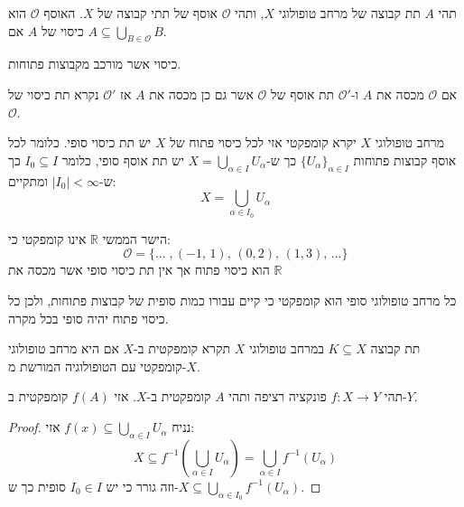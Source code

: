 \documentclass{tstextbook}
\begin{document}
\begin{definition}[כיסוי]
תהי \(A\) תת קבוצה של מרחב טופולוגי \(X\), ותהי \(\mathcal{O}\) אוסף של תתי קבוצה של \(X\). האוסף \(\mathcal{O}\) הוא כיסוי של \(A\) אם \(A\subseteq \bigcup_{ B \in \mathcal{O}}B\).

\end{definition}
\begin{definition}
כיסוי אשר מורכב מקבוצות פתוחות.

\end{definition}
\begin{definition}[תת כיסוי]
אם \(\mathcal{O}\) מכסה את \(A\) ו-\(\mathcal{O}'\) תת אוסף של \(\mathcal{O}\) אשר גם כן מכסה את \(A\) אז \(\mathcal{O'}\) נקרא תת כיסוי של \(\mathcal{O}\).

\end{definition}
\begin{definition}
מרחב טופולוגי \(X\) יקרא קומפקטי אזי לכל כיסוי פתוח של \(X\) יש תת כיסוי סופי.
כלומר לכל אוסף קבוצות פתוחות \(\{ U_{\alpha} \}_{\alpha \in I}\) כך ש-\(X=\bigcup_{\alpha \in I}U_{\alpha}\) יש תת אוסף סופי, כלומר \(I_{0} \subseteq I\) כך ש-\(\lvert I_{0} \rvert<\infty\) ומתקיים:
$$X=\bigcup_{\alpha \in I_{0}}U_{\alpha}$$

\end{definition}
\begin{example}
הישר הממשי \(\mathbb{R}\) אינו קומפקטי כי:
$$\mathcal{O}=\{...\;,(-1,\,1),\,(0,2),\,(1,3),\,...\}$$
הוא כיסוי פתוח אך אין תת כיסוי סופי אשר מכסה את \(\mathbb{R}\)

\end{example}
\begin{example}
כל מרחב טופולוגי סופי הוא קומפקטי כי קיים עבורו כמות סופית של קבוצות פתוחות, ולכן כל כיסוי פתוח יהיה סופי בכל מקרה.

\end{example}
\begin{definition}
תת קבוצה \(K\subseteq X\) במרחב טופולוגי \(X\) תקרא קומפקטית ב-\(X\) אם היא מרחב טופולוגי קומפקטי עם הטופולוגיה המורשת מ-\(X\).

\end{definition}
\begin{proposition}
תהי \(f:X\to Y\) פונקציה רציפה ותהי \(A\) קומפקטית ב-\(X\). אזי \(f(A)\) קומפקטית ב-\(Y\).

\end{proposition}
\begin{proof}
נניח \(f(x)\subseteq \bigcup_{\alpha \in I}U_{\alpha}\) אזי:
$$X\subseteq f^{-1} \left( \bigcup_{\alpha \in I}U_{\alpha} \right)=\bigcup_{\alpha \in I}f^{-1} (U_{\alpha})$$
וזה גורר כי יש \(I_{0} \in I\) סופית כך ש-\(X\subseteq \bigcup_{{\alpha \in I_{0}}}f^{-1}(U_{\alpha})\).

\end{proof}
\end{document}

